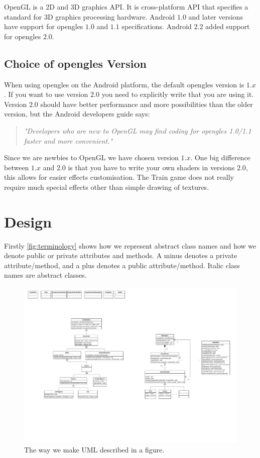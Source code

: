 OpenGL is a 2D and 3D graphics API. It is cross-platform API that specifies a standard for 3D graphics processing hardware. Android $1.0$ and later versions have support for \ac{opengles} $1.0$ and $1.1$ specifications. Android $2.2$ added support for \ac{opengles} $2.0$. \citep{androidopengl, khronosopengles}

\subsection*{Choice of \ac{opengles} Version}
When using \ac{opengles} on the Android platform, the default \ac{opengles} version is $1.x$. If you want to use version $2.0$ you need to explicitly write that you are using it. Version $2.0$ should have better performance and more possibilities than the older version, but the Android developers guide says:
\begin{quote}
\textit{"Developers who are new to OpenGL may find coding for \ac{opengles} 1.0/1.1 faster and more convenient."} \citep{androidopengl}
\end{quote}
Since we are newbies to OpenGL we have chosen version $1.x$. One big difference between $1.x$ and $2.0$ is that you have to write your own shaders in versions $2.0$, this allows for easier effects customisation. The Train game does not really require much special effects other than simple drawing of textures.

\section{Design}
Firstly \autoref{fig:terminology} shows how we represent abstract class names and how we denote public or private attributes and methods. A minus denotes a private attribute/method, and a plus denotes a public attribute/method. Italic class names are abstract classes.
\begin{figure}[H]
\centering
\includegraphics[page=4,width=0.7\linewidth]{img/opengl.pdf}
\caption{The way we make UML described in a figure.}
\label{fig:terminology}
\end{figure}

